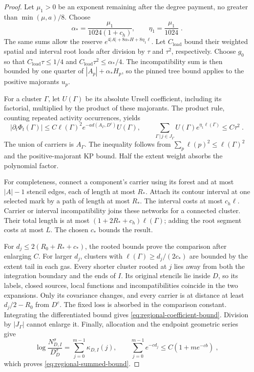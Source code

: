 \documentclass[11pt]{article}
\begin{document}
\begin{proof}
Let $\mu_1>0$ be an exponent remaining after the degree payment, no greater than $\min(\mu,a)/8$. Choose
\begin{equation}
    \alpha_*=\frac{\mu_1}{1024(1+c_h)},
    \qquad \eta_1=\frac{\mu_1}{1024}\;.
\end{equation}
The same sums allow the reserve $e^{4|A|+8\alpha_*H+8\eta_1\ell}$. Let $C_{\mathrm{load}}$ bound their weighted spatial and interval root loads after division by $\tau$ and $\tau^2$, respectively. Choose $g_0$ so that $C_{\mathrm{load}}\tau\leq1/4$ and $C_{\mathrm{load}}\tau^2\leq\alpha_*/4$. The incompatibility sum is then bounded by one quarter of $|A_p|+\alpha_*H_p$, so the pinned tree bound applies to the positive majorants $u_p$.

For a cluster $\Gamma$, let $U(\Gamma)$ be its absolute Ursell coefficient, including its factorial, multiplied by the product of these majorants. The product rule, counting repeated activity occurrences, yields
\begin{equation}
    |\partial_t\Phi_t(\Gamma)|
        \leq C\ell(\Gamma)^2
            e^{-a d(A_\Gamma,D^c)}U(\Gamma),
    \qquad
    \sum_{\Gamma\, | \,j\in J_\Gamma}
        U(\Gamma)e^{\eta_1\ell(\Gamma)}\leq C\tau^2\;.
\end{equation}
The union of carriers is $A_\Gamma$. The inequality follows from $\sum_p\ell(p)^2\leq\ell(\Gamma)^2$ and the positive-majorant KP bound. Half the extent weight absorbs the polynomial factor.

For completeness, connect a component's carrier using its forest and at most $|A| -1$ stencil edges, each of length at most $R_*$. Attach its contour interval at one selected mark by a path of length at most $R_*$. The interval costs at most $c_h\ell$. Carrier or interval incompatibility joins these networks for a connected cluster. Their total length is at most $(1+2R_*+c_h)\ell(\Gamma)$; adding the root segment costs at most $L$. The chosen $c_*$ bounds the result.

For $d_j\leq 2(R_0+R_*+c_*)$, the rooted bounds prove the comparison after enlarging $C$. For larger $d_j$, clusters with $\ell(\Gamma)\geq d_j/(2c_*)$ are bounded by the extent tail in each gas. Every shorter cluster rooted at $j$ lies away from both the integration boundary and the ends of $I$. Its original stencils lie inside $D$, so its labels, closed sources, local functions and incompatibilities coincide in the two expansions. Only its covariance changes, and every carrier is at distance at least $d_j/2-R_0$ from $D^c$. The fixed loss is absorbed in the comparison constant. Integrating the differentiated bound gives \eqref{eq:regional-coefficient-bound}. Division by $|J_\Gamma|$ cannot enlarge it. Finally, allocation and the endpoint geometric series give
\begin{equation}
    \log\frac{N_{D,I}^\sigma}{D_D^\sigma}
        =\sum_{j=0}^{m-1}\kappa_{D,I}(j),
    \qquad
    \sum_{j=0}^{m-1}e^{-cd_j}\leq C(1+me^{-cb})\;,
\end{equation}
which proves \eqref{eq:regional-summed-bound}.
\end{proof}
\end{document}
